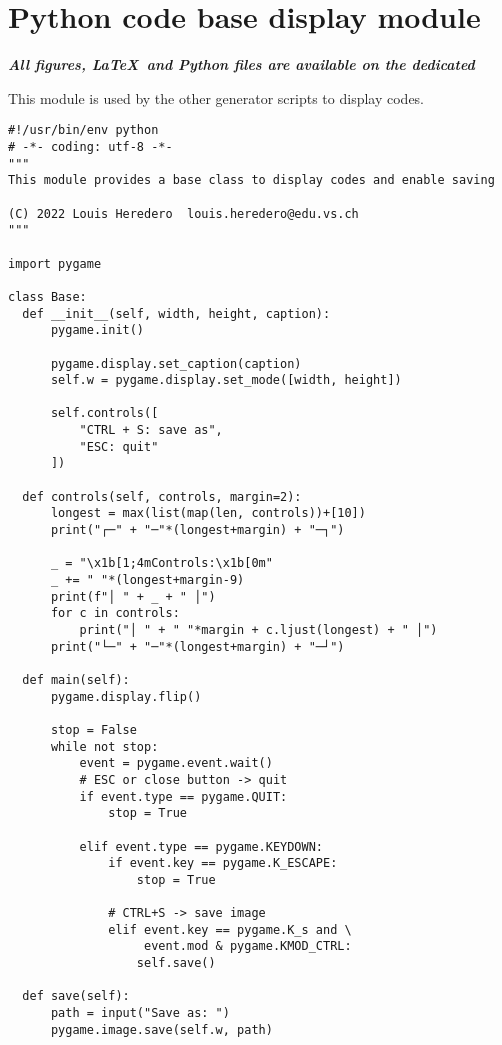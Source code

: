 \appendix

\chapter{Python code base display module}
\label{app:base_py}

\textbf{\emph{All figures, \LaTeX\  and Python files are available on the dedicated }}

\vspace{12pt}

This module is used by the other generator scripts to display codes.

\begin{tcolorbox}[breakable,colback=white,title=base.py]
\begin{verbatim}
#!/usr/bin/env python
# -*- coding: utf-8 -*-
"""
This module provides a base class to display codes and enable saving

(C) 2022 Louis Heredero  louis.heredero@edu.vs.ch
"""

import pygame

class Base:
  def __init__(self, width, height, caption):
      pygame.init()

      pygame.display.set_caption(caption)
      self.w = pygame.display.set_mode([width, height])

      self.controls([
          "CTRL + S: save as",
          "ESC: quit"
      ])

  def controls(self, controls, margin=2):
      longest = max(list(map(len, controls))+[10])
      print("┌─" + "─"*(longest+margin) + "─┐")

      _ = "\x1b[1;4mControls:\x1b[0m"
      _ += " "*(longest+margin-9)
      print(f"│ " + _ + " │")
      for c in controls:
          print("│ " + " "*margin + c.ljust(longest) + " │")
      print("└─" + "─"*(longest+margin) + "─┘")

  def main(self):
      pygame.display.flip()

      stop = False
      while not stop:
          event = pygame.event.wait()
          # ESC or close button -> quit
          if event.type == pygame.QUIT:
              stop = True

          elif event.type == pygame.KEYDOWN:
              if event.key == pygame.K_ESCAPE:
                  stop = True

              # CTRL+S -> save image
              elif event.key == pygame.K_s and \
                   event.mod & pygame.KMOD_CTRL:
                  self.save()

  def save(self):
      path = input("Save as: ")
      pygame.image.save(self.w, path)
\end{verbatim}
\end{tcolorbox}

